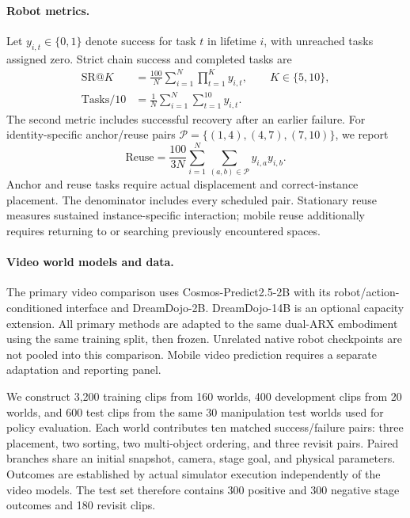 \paragraph{Robot metrics.}
Let $y_{i,t}\in\{0,1\}$ denote success for task $t$ in lifetime $i$, with
unreached tasks assigned zero. Strict chain success and completed tasks are
\begin{align}
\mathrm{SR@}K &=
\frac{100}{N}\sum_{i=1}^{N}\prod_{t=1}^{K}y_{i,t},
\qquad K\in\{5,10\},\\
\mathrm{Tasks}/10 &=
\frac{1}{N}\sum_{i=1}^{N}\sum_{t=1}^{10}y_{i,t}.
\end{align}
The second metric includes successful recovery after an earlier failure.
For identity-specific anchor/reuse pairs
$\mathcal{P}=\{(1,4),(4,7),(7,10)\}$, we report
\begin{equation}
\mathrm{Reuse}=
\frac{100}{3N}\sum_{i=1}^{N}
\sum_{(a,b)\in\mathcal{P}}y_{i,a}y_{i,b}.
\end{equation}
Anchor and reuse tasks require actual displacement and correct-instance
placement. The denominator includes every scheduled pair. Stationary reuse
measures sustained instance-specific interaction; mobile reuse additionally
requires returning to or searching previously encountered spaces.

\paragraph{Video world models and data.}
The primary video comparison uses Cosmos-Predict2.5-2B with its
robot/action-conditioned interface and DreamDojo-2B. DreamDojo-14B is an
optional capacity extension. All primary methods are adapted to the same
dual-ARX embodiment using the same training split, then frozen.
Unrelated native robot checkpoints are not pooled into this comparison.
Mobile video prediction requires a separate adaptation and reporting panel.

We construct 3,200 training clips from 160 worlds, 400 development clips from
20 worlds, and 600 test clips from the same 30 manipulation test worlds used
for policy evaluation. Each world contributes ten matched success/failure
pairs: three placement, two sorting, two multi-object ordering, and three
revisit pairs. Paired branches share an initial snapshot, camera, stage goal,
and physical parameters. Outcomes are established by actual simulator
execution independently of the video models. The test set therefore contains
300 positive and 300 negative stage outcomes and 180 revisit clips.

